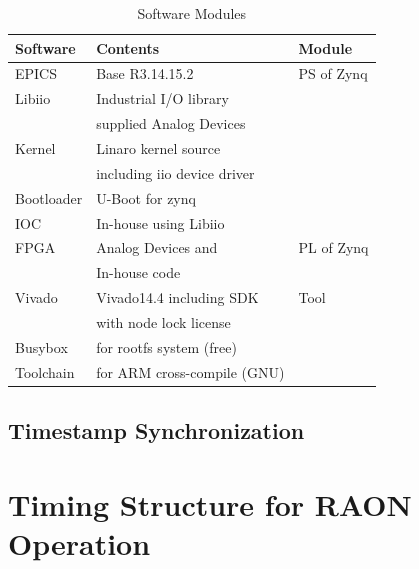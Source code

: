 \documentclass[journal,reqno]{IEEEtran}
\begin{document}
\begin{table}[h!t]
	\centering
	\caption{Software Modules}
	\label{sw-conf}
	\begin{tabular}{@{}lll@{}}
		\hline
		\textbf{Software} & \textbf{Contents}                 & \textbf{Module}     \\
		\hline
		EPICS        & Base R3.14.15.2                       & PS of Zynq            \\
		Libiio       & Industrial I/O library                &                       \\
		& supplied Analog Devices               &                       \\         
		Kernel       & Linaro kernel source                  &                       \\
		& including iio device driver           &                       \\         
		Bootloader   & U-Boot for zynq                       &                       \\
		IOC          & In-house using Libiio                 &                       \\
		
		\hline
		FPGA         & Analog Devices and                    & PL of Zynq            \\
		& In-house code                         &                       \\
		
		\hline
		Vivado       & Vivado14.4 including SDK              & Tool                  \\        
		& with node lock license                &                       \\            
		Busybox      & for rootfs system (free)              &                       \\
		Toolchain    & for ARM cross-compile (GNU)           &                       \\        
		\hline
	\end{tabular}
\end{table}

\subsection{Timestamp Synchronization}


\hfill\break

\section{Timing Structure for RAON Operation}
\end{document}
